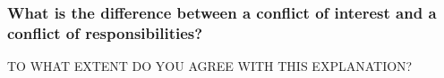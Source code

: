 \documentclass[12pt]{beamer}
\newcommand\gap{\vspace{5mm}}
\begin{document}



\begin{frame} 
\frametitle{ What is the difference between a conflict of interest and a conflict of responsibilities? 
}


\gap

TO WHAT EXTENT DO YOU AGREE WITH THIS EXPLANATION?



\end{frame} 

\begin{frame}

\end{frame}
\end{document}
